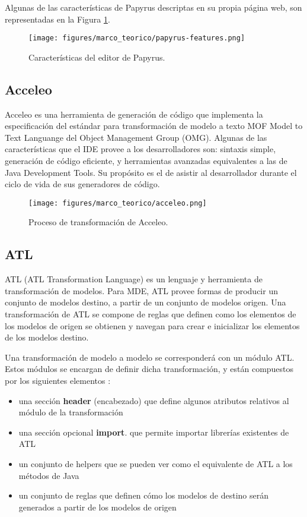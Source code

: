 Algunas de las características de Papyrus descriptas en su propia página web, son representadas en la Figura \ref{fig:marco:papyrus_editor}.

\begin{figure}[htbp]
    \centering
    \texttt{[image: figures/marco\_teorico/papyrus-features.png]}
    \caption{Características del editor de Papyrus. \cite{papyrus}}
    \label{fig:marco:papyrus_editor}
\end{figure}

\subsection{Acceleo}
Acceleo es una herramienta de generación de código que implementa la especificación del estándar para transformación de modelo a texto MOF Model to Text Languange del Object Management Group (OMG). Algunas de las características que el IDE provee a los desarrolladores son: sintaxis simple, generación de código eficiente, y herramientas avanzadas equivalentes a las de Java Development Tools. Su propósito es el de asistir al desarrollador durante el ciclo de vida de sus generadores de código. \cite{acceleo}

\begin{figure}[htbp]
    \centering
    \texttt{[image: figures/marco\_teorico/acceleo.png]}
    \caption{Proceso de transformación de Acceleo.}
    \label{fig:marco:acceleo_transformation}
\end{figure}

\subsection{ATL}
ATL (ATL Transformation Language) es un lenguaje y herramienta de transformación de modelos. Para MDE, ATL provee formas de producir un conjunto de modelos destino, a partir de un conjunto de modelos origen. Una transformación de ATL se compone de reglas que definen como los elementos de los modelos de origen se obtienen y navegan para crear e inicializar los elementos de los modelos destino. \cite{atl}

Una transformación de modelo a modelo se corresponderá con un módulo ATL. Estos módulos se encargan de definir dicha transformación, y están compuestos por los siguientes elementos \cite{atloverview}:

\begin{itemize}
    \item una sección \textbf{header} (encabezado) que define algunos atributos relativos al módulo de la transformación
    \item una sección opcional \textbf{import}. que permite importar librerías existentes de ATL
    \item un conjunto de helpers que se pueden ver como el equivalente de ATL a los métodos de Java
    \item un conjunto de reglas que definen cómo los modelos de destino serán generados a partir de los modelos de origen
\end{itemize}

